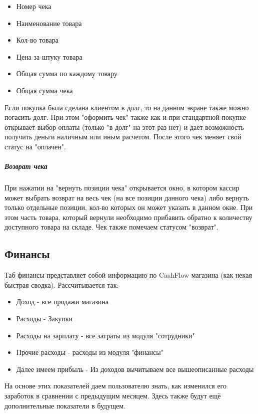 \documentclass[DIV=calc, paper=a4, fontsize=11pt]{scrartcl} %
\begin{document}
\begin{itemize}
	\item Номер чека
	\item Наименование товара
	\item Кол-во товара
	\item Цена за штуку товара
	\item Общая сумма по каждому товару
	\item Общая сумма чека
\end{itemize}

Если покупка была сделана клиентом в долг, то на данном экране также можно погасить долг. При этом "оформить чек" также как и при стандартной покупке открывает выбор оплаты (только "в долг" на этот раз нет) и дает возможность получить деньги наличным или иным расчетом. После этого чек меняет свой статус на "оплачен".

\subparagraph{Возврат чека}
При нажатии на "вернуть позиции чека" открывается окно, в котором кассир может выбрать возврат на весь чек (на все позиции данного чека) либо вернуть только отдельные позиции, кол-во которых он может указать в данном окне. При этом часть товара, который вернули необходимо прибавить обратно к количеству доступного товара на складе. Чек также помечаем статусом "возврат".

\subsection{Финансы}

Таб финансы представляет собой информацию по CashFlow магазина (как некая быстрая сводка). Рассчитывается так:

\begin{itemize}
	\item Доход - все продажи магазина
	\item Расходы - Закупки
	\item Расходы на зарплату - все затраты из модуля "сотрудники"
	\item Прочие расходы - расходы из модуля "финансы"
	\item Далее имеем прибыль - Из доходов вычитываем все вышеописанные расходы
\end{itemize}

На основе этих показателей даем пользователю знать, как изменился его заработок в сравнении с предыдущим месяцем. Здесь также будут ещё дополнительные показатели в будущем.

\\[0.5cm] 
\end{document}
